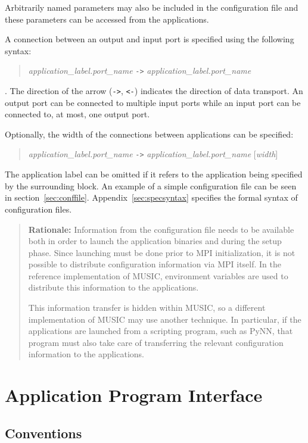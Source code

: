 \documentclass[a4paper,twoside]{report}
\newenvironment{rationale}%
{\par\begin{quote}\textbf{Rationale:}}%
{\par\end{quote}}
\begin{document}
Arbitrarily named parameters may also be included in the configuration
file and these parameters can be accessed from the applications.

A connection between an output and input port is specified using the
following syntax:
\begin{quote}
  \emph{application\_label.port\_name} \lstinline|->| \emph{application\_label.port\_name}
\end{quote}
\noindent.  The direction of the arrow (\lstinline|->|, \lstinline|<-|) indicates the
direction of data transport.  An output port can be connected to
multiple input ports while an input port can be connected to, at most,
one output port.

Optionally, the width of the connections between applications can be
specified:
\begin{quote}
  \emph{application\_label.port\_name} \lstinline|->|
  \emph{application\_label.port\_name} [\emph{width}]
\end{quote}
The application label can be omitted if it refers to the application
being specified by the surrounding block.
An example of a simple configuration file can be seen in
section~\ref{sec:conffile}.  Appendix~\ref{sec:specsyntax} specifies
the formal syntax of configuration files.

\begin{rationale}
  Information from the configuration file needs to be available both
  in order to launch the application binaries and during the setup
  phase.  Since launching must be done prior to MPI initialization, it
  is not possible to distribute configuration information via MPI
  itself.  In the reference implementation of MUSIC, environment
  variables are used to distribute this information to the
  applications.

  This information transfer is hidden within MUSIC, so a different
  implementation of MUSIC may use another technique.  In particular,
  if the applications are launched from a scripting program, such as
  PyNN, that program must also take care of transferring
  the relevant configuration information to the applications.
\end{rationale}


\chapter{Application Program Interface}

\section{Conventions}
\end{document}
